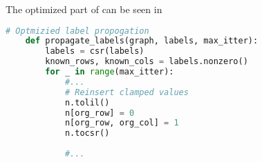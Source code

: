 The optimized part of  can be seen in 


\begin{lstlisting}[language=python, caption = Label propagation, label=alg:propalgopt]
    # Optmizied label propogation
    def propagate_labels(graph, labels, max_itter):
        labels = csr(labels)
        known_rows, known_cols = labels.nonzero()
        for _ in range(max_itter):
            #...
            # Reinsert clamped values
            n.tolil()
            n[org_row] = 0
            n[org_row, org_col] = 1
            n.tocsr()
            
            #...
    \end{lstlisting}